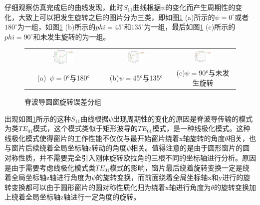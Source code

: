 \documentclass[master]{thesis-uestc}
\begin{document}
仔细观察仿真完成后的曲线发现，此时$S_{11}$曲线根据$\psi$的变化而产生周期性的变化，大致上可以把发生旋转之后的图片分为三类，即如图\ref{fig:脊波导圆窗旋转分组} (a)所示的$\psi = 0 ^\circ$或者$180 ^\circ$为一组，如图\ref{fig:脊波导圆窗旋转分组} (b)所示的$phi = 45 ^\circ$和$135 ^\circ$为一组，最后如图\ref{fig:脊波导圆窗旋转分组} (c)所示的$phi = 90 ^\circ$和未发生旋转的为一组。
\begin{figure}[!htb]
    \small
    \centering
    \begin{tabular}{@{\ }c@{\ }c@{\ }c}
        \includegraphics[width=0.3\textwidth]{pic/chapter5/分组-0-180.png} & 
        \hspace{5pt}
        \includegraphics[width=0.3\textwidth]{pic/chapter5/分组-45-135.png}&
        \hspace{5pt}
        \includegraphics[width=0.3\textwidth]{pic/chapter5/分组-90.png}      \\
        \mbox{\small (a) \(\psi=\)0°与180°}                                                                               & 
        \mbox{\small (b)\(\psi=\)45°与135°} & 
        \mbox{\small (c)\(\psi=\)90°与未发生旋转}                                                                                  \\
    \end{tabular}
    \caption{脊波导圆窗旋转误差分组}
    \label{fig:脊波导圆窗旋转分组}
\end{figure}

出现如图\ref{fig:脊波导圆窗旋转分组}所示的这种$S_{11}$曲线根据$\psi$出现周期性的变化的原因是脊波导传输的模式为类$TE_{01}$模式，这个模式类似于矩形波导的$TE_{01}$模式，是一种线极化模式。这种线极化模式使得窗片的工作性能不仅仅与最开始窗片绕着x轴旋转的角度$\theta$相关，也与窗片后续绕着全局坐标轴z转动的角度$\psi$相关。值得注意的是由于圆形窗片的圆对称性质，并不需要完全引入刚体旋转欧拉角的三根不同的坐标轴进行分析。原因是由于需要考虑线极化模式类$TE_{01}$模式的影响，窗片最后绕着旋转变换一定是绕着全局坐标轴z轴进行角度为$\psi$的旋转变换，而前面绕着全局坐标轴x和y进行的旋转变换都可以由于圆形窗片的圆对称性质化归为绕着x轴进行角度为$\theta$的旋转变换加上绕着全局坐标轴z轴进行一定角度的旋转。
\end{document}
